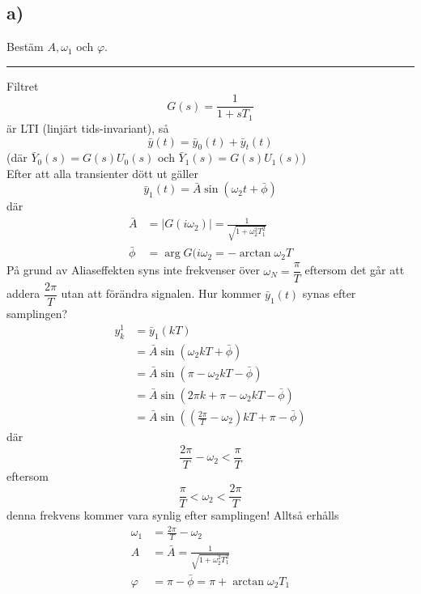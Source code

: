 \documentclass[12pt]{article}
\newcommand{\qline}{\hrule \vspace*{10pt}}
\begin{document}
\subsection*{a)}
Bestäm $A, \omega_1$ och $\varphi$.
\qline
Filtret 
\[G(s) = \frac{1}{1+sT_1}\]
är LTI (linjärt tids-invariant), så 
\[\bar{y}(t) = \bar{y}_0(t) + \bar{y}_t(t)\]
(där $\bar{Y}_0(s) = G(s)U_0(s)$ och $\bar{Y}_1(s) = G(s)U_1(s)$) \\
Efter att alla transienter dött ut gäller 
\[\bar{y}_1(t) = \bar{A}\sin{(\omega_2 t + \bar{\phi})}\]
där 
\begin{align*}
  \bar{A} &= |G(i\omega_2)| = \frac{1}{\sqrt{1+\omega_2^2T_1^2}} \\
  \bar{\phi} &= \arg{G(i\omega_2} = -\arctan{\omega_2 T}
\end{align*}
På grund av Aliaseffekten syns inte frekvenser över $\omega_N = \dfrac{\pi}{T}$ eftersom det går att addera $\dfrac{2\pi}{T}$ utan att förändra signalen. Hur kommer $\bar{y}_1(t)$ synas efter samplingen?
\begin{align}
  y_k^{1} &= \bar{y}_1(kT) \\
          &= \bar{A} \sin{(\omega_2 kT + \bar{\phi})} \\
          &= \bar{A} \sin{(\pi - \omega_2 kT - \bar{\phi})} \\
          &= \bar{A} \sin{(2\pi k + \pi - \omega_2 kT - \bar{\phi})} \\
          &= \bar{A} \sin{\left( \left(\frac{2\pi}{T}-\omega_2\right)kT + \pi - \bar{\phi}\right)}
\end{align}
där 
\[\frac{2\pi}{T} - \omega_2 < \frac{\pi}{T}\]
eftersom 
\[\frac{\pi}{T} < \omega_2 < \frac{2\pi}{T}\]
denna frekvens kommer vara synlig efter samplingen! Alltså erhålls
\begin{align*}
  \omega_1 &= \frac{2\pi}{T} - \omega_2 \\
  A &= \bar{A} = \frac{1}{\sqrt{1+\omega_2^2 T_1^2}} \\
  \varphi &= \pi - \bar{\phi} = \pi + \arctan{\omega_2 T_1}
\end{align*}
\end{document}
